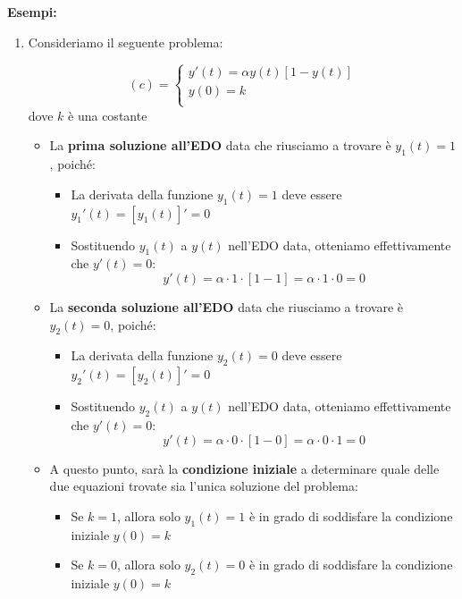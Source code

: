 \documentclass[a4paper, 12pt]{report}
\begin{document}
    \textbf{Esempi:}
    
    \begin{enumerate}
        \item Consideriamo il seguente problema:
        
        $$
            (c) = \left \{ \begin{array}{l}
                y'(t) = \alpha y(t)  [1-y(t)] \\
                y(0) = k \\
            \end{array}\right .
        $$
        dove $k$ è una costante
        
        \begin{itemize}
            \item La \textbf{prima soluzione all'EDO} data che riusciamo a trovare è $y_1(t) = 1$, poiché:
            
            \begin{itemize}
                \item La derivata della funzione $y_1(t) = 1$ deve essere $y_1'(t) = [y_1(t)]' = 0$
                \item Sostituendo $y_1(t)$ a $y(t)$ nell'EDO data, otteniamo effettivamente che $y'(t) = 0$:
                \[ y'(t) = \alpha \cdot 1 \cdot [1-1] = \alpha \cdot 1 \cdot 0 = 0\]
            \end{itemize}
            
            \item La \textbf{seconda soluzione all'EDO} data che riusciamo a trovare è $y_2(t) = 0$, poiché:
            
            \begin{itemize}
                \item La derivata della funzione $y_2(t) = 0$ deve essere $y_2'(t) = [y_2(t)]' = 0$
                \item Sostituendo $y_2(t)$ a $y(t)$ nell'EDO data, otteniamo effettivamente che $y'(t) = 0$:
                \[ y'(t) = \alpha \cdot 0 \cdot [1-0] = \alpha \cdot 0 \cdot 1 = 0\]
            \end{itemize}
            
            \item A questo punto, sarà la \textbf{condizione iniziale} a determinare quale delle due equazioni trovate sia l'unica soluzione del problema:
            
            \begin{itemize}
                \item Se $k = 1$, allora solo $y_1(t) = 1$ è in grado di soddisfare la condizione iniziale $y(0) = k$
                \item Se $k = 0$, allora solo $y_2(t) = 0$ è in grado di soddisfare la condizione iniziale $y(0) = k$
            \end{itemize}
        \end{itemize}
        

\end{enumerate}
\end{document}
